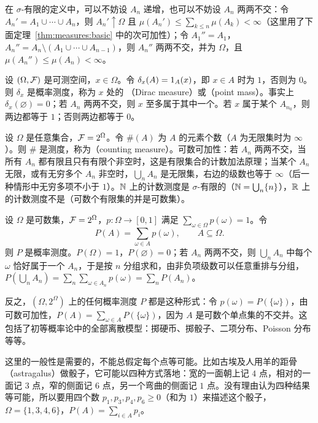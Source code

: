 在 $\sigma$-有限的定义中，可以不妨设 $A_n$ 递增，也可以不妨设 $A_n$ 两两不交：令 $A_n'=A_1\cup\cdots\cup A_n$，则 $A_n'\uparrow\Omega$ 且 $\mu(A_n')\leqslant\sum_{k\leqslant n}\mu(A_k)<\infty$（这里用了下面定理~\ref{thm:measures:basic} 中的次可加性）；令 $A_1''=A_1$，$A_n''=A_n\setminus(A_1\cup\cdots\cup A_{n-1})$，则 $A_n''$ 两两不交，并为 $\Omega$，且 $\mu(A_n'')\leqslant\mu(A_n)<\infty$。

\begin{example}[Dirac 测度]\label{ex:measures:dirac}
设 $(\Omega,\mathcal{F})$ 是可测空间，$x\in\Omega$。令 $\delta_x(A)=1_A(x)$，即 $x\in A$ 时为 $1$，否则为 $0$。则 $\delta_x$ 是概率测度，称为 $x$ 处的 （Dirac measure）或（point mass）。事实上 $\delta_x(\varnothing)=0$；若 $A_n$ 两两不交，则 $x$ 至多属于其中一个。若 $x$ 属于某个 $A_{n_0}$，则两边都等于 $1$；否则两边都等于 $0$。
\end{example}

\begin{example}[计数测度]\label{ex:measures:counting}
设 $\Omega$ 是任意集合，$\mathcal{F}=2^\Omega$。令 $\#(A)$ 为 $A$ 的元素个数（$A$ 为无限集时为 $\infty$）。则 $\#$ 是测度，称为（counting measure）。可数可加性：若 $A_n$ 两两不交，当所有 $A_n$ 都有限且只有有限个非空时，这是有限集合的计数加法原理；当某个 $A_n$ 无限，或有无穷多个 $A_n$ 非空时，$\bigcup_nA_n$ 是无限集，右边的级数也等于 $\infty$（后一种情形中无穷多项不小于 $1$）。$\mathbb{N}$ 上的计数测度是 $\sigma$-有限的（$\mathbb{N}=\bigcup_n\{n\}$），$\mathbb{R}$ 上的计数测度不是（可数个有限集的并是可数集）。
\end{example}

\begin{example}[离散概率空间]\label{ex:measures:discrete}
设 $\Omega$ 是可数集，$\mathcal{F}=2^\Omega$，$p:\Omega\to[0,1]$ 满足 $\sum_{\omega\in\Omega}p(\omega)=1$。令
\[
P(A)=\sum_{\omega\in A}p(\omega),\qquad A\subseteq\Omega.
\]
则 $P$ 是概率测度。$P(\Omega)=1$，$P(\varnothing)=0$；若 $A_n$ 两两不交，则 $\bigcup_nA_n$ 中每个 $\omega$ 恰好属于一个 $A_n$，于是按 $n$ 分组求和，由非负项级数可以任意重排与分组，$P(\bigcup_nA_n)=\sum_n\sum_{\omega\in A_n}p(\omega)=\sum_nP(A_n)$。

反之，$(\Omega,2^\Omega)$ 上的任何概率测度 $P$ 都是这种形式：令 $p(\omega)=P(\{\omega\})$，由可数可加性，$P(A)=\sum_{\omega\in A}P(\{\omega\})$，因为 $A$ 是可数个单点集的不交并。这包括了初等概率论中的全部离散模型：掷硬币、掷骰子、二项分布、Poisson 分布等等。

这里的一般性是需要的，不能总假定每个点等可能。比如古埃及人用羊的距骨（astragalus）做骰子，它可能以四种方式落地：宽的一面朝上记 $4$ 点，相对的一面记 $3$ 点，窄的侧面记 $6$ 点，另一个弯曲的侧面记 $1$ 点。没有理由认为四种结果等可能，所以要用四个数 $p_1,p_3,p_4,p_6\geqslant0$（和为 $1$）来描述这个骰子，$\Omega=\{1,3,4,6\}$，$P(A)=\sum_{i\in A}p_i$。
\end{example}


